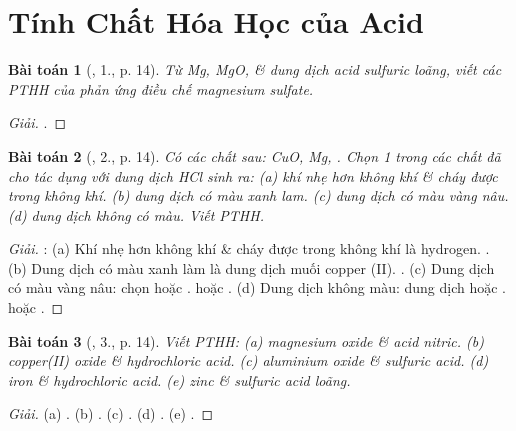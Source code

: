\documentclass{article}
\newtheorem{baitoan}{Bài toán}
\begin{document}

\section{Tính Chất Hóa Học của Acid}

\begin{baitoan}[\cite{SGK_Hoa_Hoc_9}, 1., p. 14]
	Từ {\rm Mg, MgO, } \& dung dịch acid sulfuric loãng, viết các {\rm PTHH} của phản ứng điều chế magnesium sulfate.
\end{baitoan}

\begin{proof}[Giải]
	.
\end{proof}

\begin{baitoan}[\cite{SGK_Hoa_Hoc_9}, 2., p. 14]
	Có các chất sau: {\rm CuO, Mg, }. Chọn 1 trong các chất đã cho tác dụng với dung dịch {\rm HCl} sinh ra: (a) khí nhẹ hơn không khí \& cháy được trong không khí. (b) dung dịch có màu xanh lam. (c) dung dịch có màu vàng nâu. (d) dung dịch không có màu. Viết {\rm PTHH}.
\end{baitoan}

\begin{proof}[Giải]
	\cite{Ninh_giai_BT_Hoa_Hoc_9}: (a) Khí nhẹ hơn không khí \& cháy được trong không khí là hydrogen. . (b) Dung dịch có màu xanh làm là dung dịch muối copper (II). . (c) Dung dịch có màu vàng nâu: chọn  hoặc .  hoặc . (d) Dung dịch không màu: dung dịch  hoặc .  hoặc .
\end{proof}

\begin{baitoan}[\cite{SGK_Hoa_Hoc_9}, 3., p. 14]
	Viết {\rm PTHH}: (a) magnesium oxide \& acid nitric. (b) copper(II) oxide \& hydrochloric acid. (c) aluminium oxide \& sulfuric acid. (d) iron \& hydrochloric acid. (e) zinc \& sulfuric acid loãng.
\end{baitoan}

\begin{proof}[Giải]
	(a) . (b) . (c) . (d) . (e) .
\end{proof}
\end{document}
